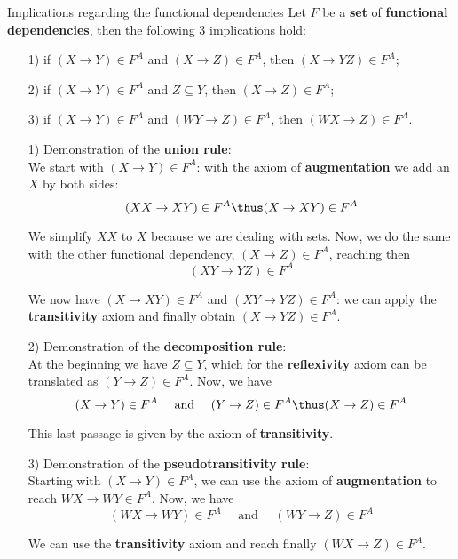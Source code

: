 \begin{theorem}{Implications regarding the functional dependencies}
    Let $F$ be a \textbf{set} of \textbf{functional dependencies}, then the following 3 implications hold:
    \begin{itemize}
        \item [1)] if $(X \rightarrow Y) \in F^A$ and $(X \rightarrow Z) \in F^A$, then $(X \rightarrow YZ) \in F^A$;
        \item [2)] if $(X \rightarrow Y) \in F^A$ and $Z \subseteq Y$, then $(X \rightarrow Z) \in F^A$;
        \item [3)] if $(X \rightarrow Y) \in F^A$ and $(WY \rightarrow Z) \in F^A$, then $(WX \rightarrow Z) \in F^A$.
    \end{itemize}
\end{theorem}
\begin{longproof}
    \begin{itemize}
        \item [1)] Demonstration of the \textbf{union rule}:\\
        We start with $(X \rightarrow Y) \in F^A$: with the axiom of \textbf{augmentation} we add an $X$ by both sides:
        \[ (XX \rightarrow XY) \in F^A \thus (X \rightarrow XY) \in F^A \]

        We simplify $XX$ to $X$ because we are dealing with sets. Now, we do the same with the other functional dependency, $(X \rightarrow Z) \in F^A$, reaching then
        \[ (XY \rightarrow YZ) \in F^A \]

        We now have $(X \rightarrow XY) \in F^A$ and $(XY \rightarrow YZ) \in F^A$: we can apply the \textbf{transitivity} axiom and finally obtain $(X \rightarrow YZ) \in F^A$.
        \item [2)] Demonstration of the \textbf{decomposition rule}:\\
        At the beginning we have $Z \subseteq Y$, which for the \textbf{reflexivity} axiom can be translated as $(Y \rightarrow Z) \in F^A$. Now, we have
        \[ (X \rightarrow Y) \in F^A \quad \text{ and } \quad (Y \rightarrow Z) \in F^A \thus (X \rightarrow Z) \in F^A \]

        This last passage is given by the axiom of \textbf{transitivity}.
        \item [3)] Demonstration of the \textbf{pseudotransitivity rule}:\\
        Starting with $(X \rightarrow Y) \in F^A$, we can use the axiom of \textbf{augmentation} to reach $WX \rightarrow WY \in F^A$. Now, we have
        \[ (WX \rightarrow WY) \in F^A \quad \text{ and } \quad (WY \rightarrow Z) \in F^A \]

        We can use the \textbf{transitivity} axiom and reach finally $(WX \rightarrow Z) \in F^A$.
    \end{itemize}
\end{longproof}

